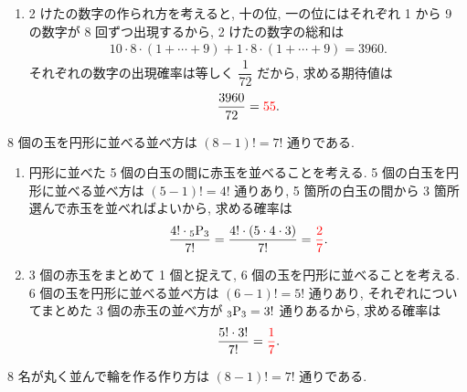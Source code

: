 \begin{qenumerate}
{\begin{enumerate}
{				この場合の確率は
				\begin{align}
					\frac{3}{9}\cdot\frac{2}{8} = \frac{6}{72}.
				\end{align}
				1 枚目に 3 の倍数以外のカードを引いた場合, 和を 3 の倍数にするために必要な 2 枚目のカードは 3 通りあり, この場合の確率は
				\begin{align}
					\frac{6}{9}\cdot\frac{3}{8} = \frac{18}{72}.
				\end{align}
				すなわち, 求める確率は
				\begin{align}
					\frac{6}{72} + \frac{18}{72} = \frac{24}{72} = \red{\frac{1}{3}}.
				\end{align}
			}
			\item{
				2 けたの数字の作られ方を考えると, 十の位, 一の位にはそれぞれ 1 から 9 の数字が 8 回ずつ出現するから, 2 けたの数字の総和は
				\begin{align}
					10\cdot 8\cdot(1 + \cdots + 9) + 1\cdot 8\cdot(1 + \cdots + 9) = 3960.
				\end{align}
				それぞれの数字の出現確率は等しく $\dfrac{1}{72}$ だから, 求める期待値は
				\begin{align}
					\frac{3960}{72} = \textcolor{red}{55}.
				\end{align}
			}
		\end{enumerate}
	}
	\item{
		8 個の玉を円形に並べる並べ方は $(8 - 1)! = 7!$ 通りである.
		\begin{enumerate}
			\item{
				円形に並べた 5 個の白玉の間に赤玉を並べることを考える.
				5 個の白玉を円形に並べる並べ方は $(5 - 1)! = 4!$ 通りあり, 5 箇所の白玉の間から 3 箇所選んで赤玉を並べればよいから, 求める確率は
				\begin{align}
					\frac{4!\cdot {{}_{5}\mathrm{P}_{3}}}{7!} = \frac{4!\cdot (5\cdot 4\cdot 3)}{7!} = \textcolor{red}{\frac{2}{7}}.
				\end{align}
			}
			\item{
				3 個の赤玉をまとめて 1 個と捉えて, 6 個の玉を円形に並べることを考える.
				6 個の玉を円形に並べる並べ方は $(6 - 1)! = 5!$ 通りあり, それぞれについてまとめた 3 個の赤玉の並べ方が ${{}_{3}\mathrm{P}_{3}} = 3!$ 通りあるから, 求める確率は
				\begin{align}
					\frac{5!\cdot 3!}{7!} = \textcolor{red}{\frac{1}{7}}.
				\end{align}
			}
		\end{enumerate}
	}
	\item{
		8 名が丸く並んで輪を作る作り方は $(8 - 1)! = 7!$ 通りである.
		\begin{enumerate}

\end{enumerate}}
\end{qenumerate}
